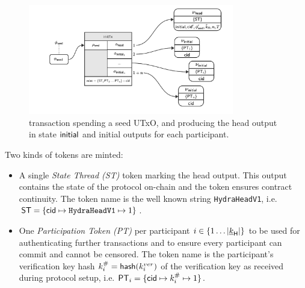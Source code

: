 \begin{figure}
	\centering
	\includegraphics[width=0.8\textwidth]{figures/initTx.pdf}
	\caption{\mtxInit{} transaction spending a seed UTxO, and producing the head
		output in state $\mathsf{initial}$ and initial outputs for each participant.}\label{fig:initTx}
\end{figure}

\noindent Two kinds of tokens are minted:
\begin{itemize}
	\item A single \emph{State Thread (ST)} token marking the head output. This
	      output contains the state of the protocol on-chain and the token ensures
	      contract continuity. The token name is the well known string
	      \texttt{HydraHeadV1}, i.e.
	      $\mathsf{ST} = \{\mathsf{cid} \mapsto \texttt{HydraHeadV1} \mapsto 1\}$.
	\item One \emph{Participation Token (PT)} per participant
	      $i \in \{1 \dots |\underline{k}_{\mathsf{H}}|  \}$ to be used for authenticating further
	      transactions and to ensure every participant can commit and cannot be
	      censored. The token name is the participant's verification key hash
	      $k^{\#}_{i} = \mathsf{hash}(k^{ver}_{i})$ of the verification key as received
	      during protocol setup, i.e.
	      $\mathsf{PT}_{i} = \{\mathsf{cid} \mapsto k^{\#}_{i} \mapsto 1\}$.
\end{itemize}

